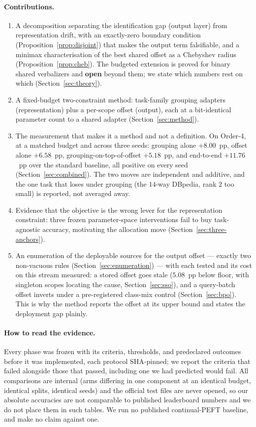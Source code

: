 \paragraph{Contributions.}
\begin{enumerate}\itemsep2pt
\item A decomposition separating the identification gap (output layer) from
  representation drift, with an exactly-zero boundary condition
  (Proposition~\ref{prop:disjoint}) that makes the output term falsifiable, and a
  minimax characterisation of the best shared offset as a Chebyshev radius
  (Proposition~\ref{prop:cheb}). The budgeted extension is proved for binary shared
  verbalizers and \textbf{open} beyond them; we state which numbers rest on which
  (Section~\ref{sec:theory}).
\item A fixed-budget two-constraint method: task-family grouping adapters
  (representation) plus a per-scope offset (output), each at a bit-identical
  parameter count to a shared adapter (Section~\ref{sec:method}).
\item The measurement that makes it a method and not a definition. On Order-4, at a
  matched budget and across three seeds: grouping alone $+8.00$~pp, offset alone
  $+6.58$~pp, grouping-on-top-of-offset $+5.18$~pp, and end-to-end $+11.76$~pp over
  the standard baseline, all positive on every seed (Section~\ref{sec:combined}).
  The two moves are independent and additive, and the one task that loses under
  grouping (the $14$-way DBpedia, rank $2$ too small) is reported, not averaged
  away.
\item Evidence that the objective is the wrong lever for the representation
  constraint: three frozen parameter-space interventions fail to buy
  task-agnostic accuracy, motivating the allocation move
  (Section~\ref{sec:three-anchors}).
\item An enumeration of the deployable sources for the output offset --- exactly two
  non-vacuous rules (Section~\ref{sec:enumeration}) --- with each tested and its cost
  on this stream measured: a stored offset goes stale ($5.08$~pp below floor, with
  singleton scopes locating the cause, Section~\ref{sec:sso}), and a query-batch
  offset inverts under a pre-registered class-mix control (Section~\ref{sec:bpo}).
  This is why the method reports the offset at its upper bound and states the
  deployment gap plainly.
\end{enumerate}

\paragraph{How to read the evidence.}
Every phase was frozen with its criteria, thresholds, and predeclared outcomes
before it was implemented, each protocol SHA-pinned; we report the criteria that
failed alongside those that passed, including one we had predicted would fail. All
comparisons are internal (arms differing in one component at an identical
budget, identical splits, identical seeds) and the official test files are never
opened, so our absolute accuracies are not comparable to published leaderboard
numbers and we do not place them in such tables. We run no published continual-PEFT
baseline, and make no claim against one.